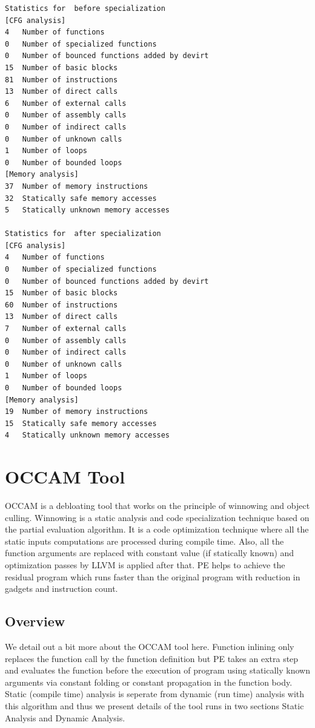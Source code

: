 \documentclass{relatorio}
\begin{document}
\begin{lstlisting}
Statistics for  before specialization
[CFG analysis]
4 	Number of functions
0 	Number of specialized functions
0 	Number of bounced functions added by devirt
15 	Number of basic blocks
81 	Number of instructions
13 	Number of direct calls
6 	Number of external calls
0 	Number of assembly calls
0 	Number of indirect calls
0 	Number of unknown calls
1 	Number of loops   
0 	Number of bounded loops
[Memory analysis]
37 	Number of memory instructions
32 	Statically safe memory accesses
5 	Statically unknown memory accesses

Statistics for  after specialization
[CFG analysis]
4 	Number of functions
0 	Number of specialized functions
0 	Number of bounced functions added by devirt
15	Number of basic blocks
60 	Number of instructions
13 	Number of direct calls
7 	Number of external calls
0 	Number of assembly calls
0 	Number of indirect calls
0 	Number of unknown calls
1 	Number of loops   
0 	Number of bounded loops
[Memory analysis]
19 	Number of memory instructions
15 	Statically safe memory accesses
4 	Statically unknown memory accesses
\end{lstlisting} 

\section{OCCAM Tool}%
\label{Tools}

OCCAM is a debloating tool that works on the principle of winnowing and object culling. Winnowing is a static analysis and code specialization technique based on the partial evaluation algorithm. It is a code optimization technique where all the static inputs computations are processed during compile time. Also, all the function arguments 
are replaced with constant value (if statically known) and optimization passes by LLVM is applied after that. PE helps to achieve the residual program which runs faster than the original program with reduction in gadgets and instruction count. 

\subsection{Overview}%
\label{Tools}

We detail out a bit more about the OCCAM tool here. Function inlining only replaces the function call by the function definition but PE takes an extra step and evaluates the function before the execution of program using statically known arguments via constant folding or constant propagation in the function body. Static (compile time) analysis is seperate from dynamic (run time) analysis with this algorithm and thus we present details of the tool runs in two sections Static Analysis and Dynamic Analysis.
\end{document}
